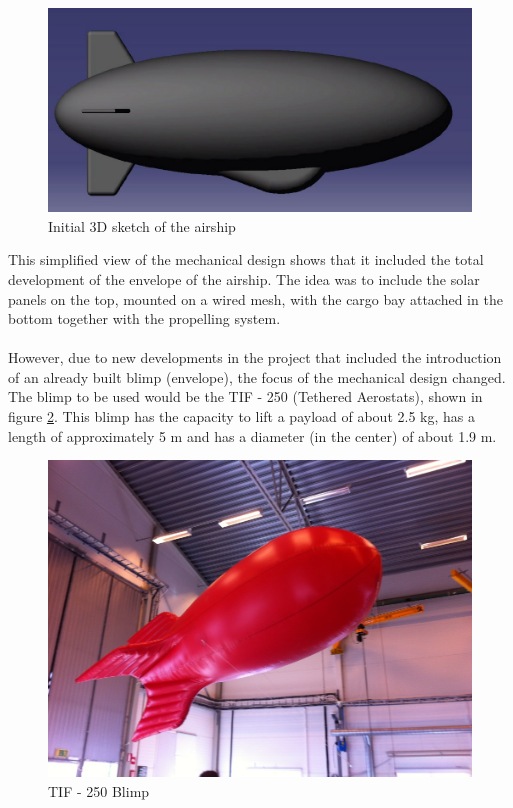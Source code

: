 \begin{figure}[bht]
\centering
\includegraphics[scale=0.5]{figures/init.png}
\caption{Initial 3D sketch of the airship}
\label{fig:init}
\end{figure}

This simplified view of the mechanical design shows that it included the total development of the envelope of the airship. The idea was to include the solar panels on the top, mounted on a wired mesh, with the cargo bay attached in the bottom together with the propelling system.
\\
\\
However, due to new developments in the project that included the introduction of an already built blimp (envelope), the focus of the mechanical design changed. The blimp to be used would be the TIF - 250 (Tethered Aerostats), shown in figure \ref{fig:blimp}. This blimp has the capacity to lift a payload of about 2.5 kg, has a length of approximately 5 m and has a diameter (in the center) of about 1.9 m.

\begin{figure}[bht]
\centering
\includegraphics[width=\textwidth]{figures/blimp.jpg}
\caption{TIF - 250 Blimp}
\label{fig:blimp}
\end{figure}



